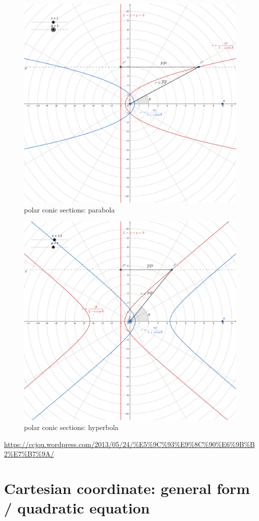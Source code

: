 \documentclass[
]{book}
\theoremstyle{definition}
\theoremstyle{definition}
\theoremstyle{definition}
\theoremstyle{definition}
\theoremstyle{remark}
\begin{document}
\begin{figure}
\includegraphics[width=0.75\linewidth]{img/conic-sections-polar-parabola} \caption{polar conic sections: parabola}\label{fig:unnamed-chunk-8}
\end{figure}

\begin{figure}
\includegraphics[width=0.75\linewidth]{img/conic-sections-polar-hyperbola} \caption{polar conic sections: hyperbola}\label{fig:unnamed-chunk-9}
\end{figure}

\url{https://ccjou.wordpress.com/2013/05/24/\%E5\%9C\%93\%E9\%8C\%90\%E6\%9B\%B2\%E7\%B7\%9A/}

\hypertarget{cartesian-coordinate-general-form-quadratic-equation}{%
\section{Cartesian coordinate: general form / quadratic equation}\label{cartesian-coordinate-general-form-quadratic-equation}}
\end{document}
